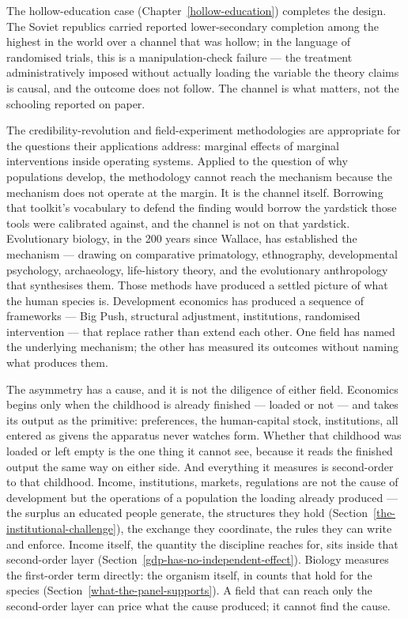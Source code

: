 \documentclass[12pt,letterpaper]{article}
\begin{document}
The hollow-education case (Chapter~\ref{hollow-education}) completes
the design. The Soviet republics carried reported lower-secondary
completion among the highest in the world over a channel that was
hollow; in the language of randomised trials, this is a
manipulation-check failure --- the treatment administratively imposed
without actually loading the variable the theory claims is causal, and
the outcome does not follow. The channel is what matters, not the
schooling reported on paper.

The credibility-revolution and field-experiment methodologies are
appropriate for the questions their applications address: marginal
effects of marginal interventions inside operating systems. Applied to the
question of why populations develop, the methodology cannot reach the
mechanism because the mechanism does not operate at the margin. It is
the channel itself. Borrowing that toolkit's vocabulary to defend the
finding would borrow the yardstick those tools were calibrated against,
and the channel is not on that yardstick. Evolutionary biology, in the
200 years since Wallace,
has established the mechanism --- drawing on comparative primatology,
ethnography, developmental psychology, archaeology, life-history
theory, and the evolutionary anthropology that synthesises them.
Those methods have produced a settled picture of what the human
species is. Development economics has produced a
sequence of frameworks --- Big Push, structural adjustment,
institutions, randomised intervention --- that replace rather than
extend each other. One field has named the underlying mechanism;
the other has measured its outcomes without naming what produces them.

The asymmetry has a cause, and it is not the diligence of either
field. Economics begins only when the childhood is already finished
--- loaded or not --- and takes its output as the primitive:
preferences, the human-capital stock, institutions, all entered as
givens the apparatus never watches form. Whether that childhood was
loaded or left empty is the one thing it cannot see, because it reads
the finished output the same way on either side. And everything it
measures is second-order to that childhood. Income, institutions,
markets, regulations are not the cause of development but the
operations of a population the loading already produced --- the
surplus an educated people generate, the structures they hold
(Section~\ref{the-institutional-challenge}), the exchange they
coordinate, the rules they can write and enforce. Income itself, the
quantity the discipline reaches for, sits inside that second-order
layer (Section~\ref{gdp-has-no-independent-effect}). Biology measures the
first-order term directly: the organism itself, in counts that hold
for the species (Section~\ref{what-the-panel-supports}). A field that
can reach only the second-order layer can price what the cause
produced; it cannot find the cause.
\end{document}
